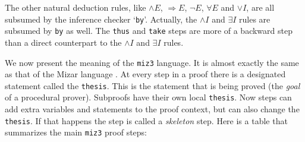 \documentclass{LMCS}
\begin{document}
\noindent
The other natural deduction rules, like ${\land}E$, ${\Rightarrow}E$, ${\neg}E$, ${\forall}E$ and ${\lor}I$, are all subsumed by the
inference checker `\texttt{by}'.
Actually, the ${\land}I$ and ${\exists}I$ rules are subsumed by \texttt{by} as well.
The \texttt{thus} and \texttt{take} steps are more of a backward step than a direct
counterpart to the
${\land}I$ and ${\exists}I$ rules.

We now present the meaning of the \texttt{miz3} language.
It is almost exactly the same as that
of the Mizar language \cite{gra:kor:nau:10}.
At every step in a proof there is a designated statement called the \texttt{thesis}.
This is the statement that is being proved (the \emph{goal} of a procedural prover).
Subproofs have their own local \texttt{thesis}.
Now steps can add extra variables and statements to the proof context,
but can also change the \texttt{thesis}.
If that happens the step is called
a \emph{skeleton} step.
Here is a table that summarizes the main \texttt{miz3} proof steps:
\end{document}
